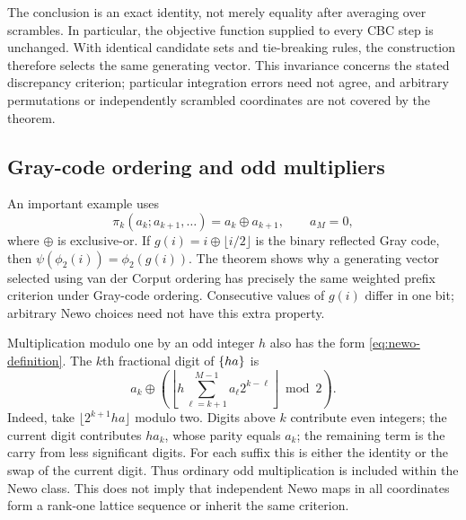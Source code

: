 The conclusion is an exact identity, not merely equality after averaging
over scrambles. In particular, the objective function supplied to every CBC
step is unchanged. With identical candidate sets and tie-breaking rules,
the construction therefore selects the same generating vector. This
invariance concerns the stated discrepancy criterion; particular integration
errors need not agree, and arbitrary permutations or independently scrambled
coordinates are not covered by the theorem.

\subsection{Gray-code ordering and odd multipliers}

An important example uses
\[
 \pi_k(a_k;a_{k+1},\ldots)=a_k\mathbin{\oplus}a_{k+1},
 \qquad a_M=0,
\]
where $\oplus$ is exclusive-or. If
$g(i)=i\mathbin{\oplus}\lfloor i/2\rfloor$ is the binary reflected Gray
code, then $\psi(\phi_2(i))=\phi_2(g(i))$. The theorem shows why a generating
vector selected using van der Corput ordering has precisely the same
weighted prefix criterion under Gray-code ordering. Consecutive values of
$g(i)$ differ in one bit; arbitrary Newo choices need not have this extra
property.

Multiplication modulo one by an odd integer $h$ also has the form
\eqref{eq:newo-definition}. The $k$th fractional digit of $\{ha\}$ is
\begin{equation}\label{eq:odd-multiplier-newo}
 a_k\mathbin{\oplus}
 \left(\left\lfloor
 h\sum_{\ell=k+1}^{M-1}a_\ell2^{k-\ell}
 \right\rfloor\bmod2\right).
\end{equation}
Indeed, take $\lfloor 2^{k+1}ha\rfloor$ modulo two. Digits above $k$
contribute even integers; the current digit contributes $ha_k$, whose
parity equals $a_k$; the remaining term is the carry from less significant
digits. For each suffix this is either the identity or the swap of the
current digit. Thus ordinary odd multiplication is included within the
Newo class. This does not imply that independent Newo maps in all coordinates
form a rank-one lattice sequence or inherit the same criterion.

\par\smallskip
\noindent{}
\par\smallskip
